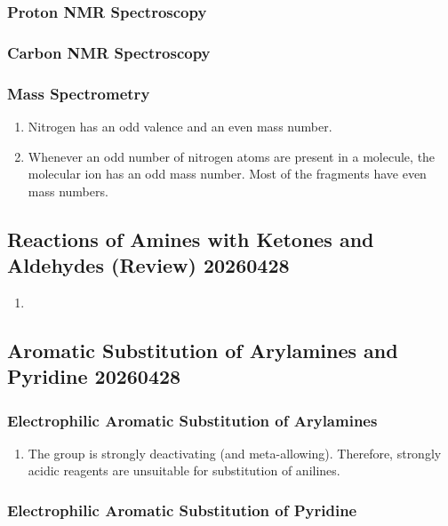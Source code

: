 \subsubsection{Proton NMR Spectroscopy}

\subsubsection{Carbon NMR Spectroscopy}

\subsubsection{Mass Spectrometry}

\begin{enumerate}
    \item Nitrogen has an odd valence and an even mass number.
    \item Whenever an odd number of nitrogen atoms are present in a molecule, the molecular ion has an odd mass number. Most of the fragments have even mass numbers.
\end{enumerate}

\subsection{Reactions of Amines with Ketones and Aldehydes (Review) 20260428}

\begin{enumerate}
    \item 
\end{enumerate}

\subsection{Aromatic Substitution of Arylamines and Pyridine 20260428}

\subsubsection{Electrophilic Aromatic Substitution of Arylamines}

\begin{enumerate}
    \item The  group is strongly deactivating (and meta-allowing). Therefore, strongly acidic reagents are unsuitable for substitution of anilines.
\end{enumerate}

\subsubsection{Electrophilic Aromatic Substitution of Pyridine}

